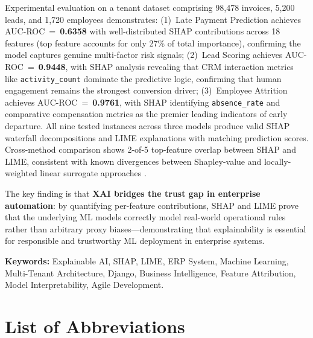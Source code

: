 \documentclass[12pt,a4paper]{report}
\begin{document}
Experimental evaluation on a tenant dataset comprising 98{,}478 invoices, 5{,}200 leads, and 1{,}720 employees demonstrates: (1)~Late Payment Prediction achieves AUC-ROC~=~\textbf{0.6358} with well-distributed SHAP contributions across 18 features (top feature accounts for only 27\% of total importance), confirming the model captures genuine multi-factor risk signals; (2)~Lead Scoring achieves AUC-ROC~=~\textbf{0.9448}, with SHAP analysis revealing that CRM interaction metrics like \texttt{activity\_count} dominate the predictive logic, confirming that human engagement remains the strongest conversion driver; (3)~Employee Attrition achieves AUC-ROC~=~\textbf{0.9761}, with SHAP identifying \texttt{absence\_rate} and comparative compensation metrics as the premier leading indicators of early departure. All nine tested instances across three models produce valid SHAP waterfall decompositions and LIME explanations with matching prediction scores. Cross-method comparison shows 2-of-5 top-feature overlap between SHAP and LIME, consistent with known divergences between Shapley-value and locally-weighted linear surrogate approaches \citep{slack2020fooling}.

The key finding is that \textbf{XAI bridges the trust gap in enterprise automation}: by quantifying per-feature contributions, SHAP and LIME prove that the underlying ML models correctly model real-world operational rules rather than arbitrary proxy biases---demonstrating that explainability is essential for responsible and trustworthy ML deployment in enterprise systems.

\vspace{0.5cm}
\noindent\textbf{Keywords:} Explainable AI, SHAP, LIME, ERP System, Machine Learning, Multi-Tenant Architecture, Django, Business Intelligence, Feature Attribution, Model Interpretability, Agile Development.

\newpage

\tableofcontents
\newpage
\listoffigures
\newpage
\listoftables
\newpage

\chapter*{List of Abbreviations}
\end{document}
